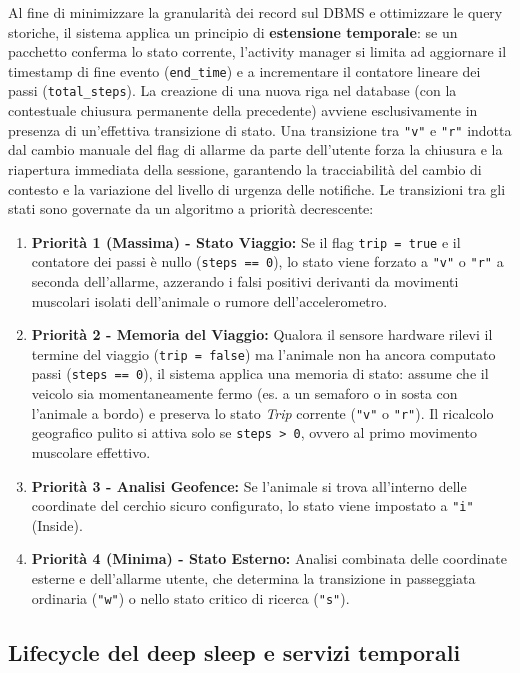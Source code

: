 \documentclass[12pt,a4paper]{article}
\begin{document}
Al fine di minimizzare la granularità dei record sul DBMS e ottimizzare le query storiche, il sistema applica un principio di \textbf{estensione temporale}: se un pacchetto conferma lo stato corrente, l'activity manager si limita ad aggiornare il timestamp di fine evento (\texttt{end\_time}) e a incrementare il contatore lineare dei passi (\texttt{total\_steps}). La creazione di una nuova riga nel database (con la contestuale chiusura permanente della precedente) avviene esclusivamente in presenza di un'effettiva transizione di stato. Una transizione tra \texttt{"v"} e \texttt{"r"} indotta dal cambio manuale del flag di allarme da parte dell'utente forza la chiusura e la riapertura immediata della sessione, garantendo la tracciabilità del cambio di contesto e la variazione del livello di urgenza delle notifiche.
Le transizioni tra gli stati sono governate da un algoritmo a priorità decrescente:
\begin{enumerate}
    \item \textbf{Priorità 1 (Massima) - Stato Viaggio:} Se il flag \texttt{trip = true} e il contatore dei passi è nullo (\texttt{steps == 0}), lo stato viene forzato a \texttt{"v"} o \texttt{"r"} a seconda dell'allarme, azzerando i falsi positivi derivanti da movimenti muscolari isolati dell'animale o rumore dell'accelerometro.
    \item \textbf{Priorità 2 - Memoria del Viaggio:} Qualora il sensore hardware rilevi il termine del viaggio (\texttt{trip = false}) ma l'animale non ha ancora computato passi (\texttt{steps == 0}), il sistema applica una memoria di stato: assume che il veicolo sia momentaneamente fermo (es. a un semaforo o in sosta con l'animale a bordo) e preserva lo stato \textit{Trip} corrente (\texttt{"v"} o \texttt{"r"}). Il ricalcolo geografico pulito si attiva solo se \texttt{steps > 0}, ovvero al primo movimento muscolare effettivo.
    \item \textbf{Priorità 3 - Analisi Geofence:} Se l'animale si trova all'interno delle coordinate del cerchio sicuro configurato, lo stato viene impostato a \texttt{"i"} (Inside).
    \item \textbf{Priorità 4 (Minima) - Stato Esterno:} Analisi combinata delle coordinate esterne e dell'allarme utente, che determina la transizione in passeggiata ordinaria (\texttt{"w"}) o nello stato critico di ricerca (\texttt{"s"}).
\end{enumerate}

\subsection{Lifecycle del deep sleep e servizi temporali}
\end{document}
